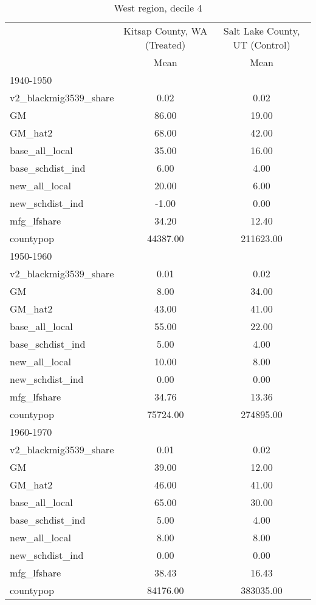 \begin{table}[htbp]\centering
\def\sym#1{\ifmmode^{#1}\else\(^{#1}\)\fi}
\caption{West region, decile 4 \label{tab1}}
\begin{tabular}{l*{2}{c}}
\toprule
                    &\multicolumn{1}{c}{Kitsap County, WA (Treated)}&\multicolumn{1}{c}{Salt Lake County, UT (Control)}\\
                    &        Mean&        Mean\\
\midrule
1940-1950           &            &            \\
v2\_blackmig3539\_share&        0.02&        0.02\\
GM                  &       86.00&       19.00\\
GM\_hat2             &       68.00&       42.00\\
base\_all\_local      &       35.00&       16.00\\
base\_schdist\_ind    &        6.00&        4.00\\
new\_all\_local       &       20.00&        6.00\\
new\_schdist\_ind     &       -1.00&        0.00\\
mfg\_lfshare         &       34.20&       12.40\\
countypop           &    44387.00&   211623.00\\
\midrule
1950-1960           &            &            \\
v2\_blackmig3539\_share&        0.01&        0.02\\
GM                  &        8.00&       34.00\\
GM\_hat2             &       43.00&       41.00\\
base\_all\_local      &       55.00&       22.00\\
base\_schdist\_ind    &        5.00&        4.00\\
new\_all\_local       &       10.00&        8.00\\
new\_schdist\_ind     &        0.00&        0.00\\
mfg\_lfshare         &       34.76&       13.36\\
countypop           &    75724.00&   274895.00\\
\midrule
1960-1970           &            &            \\
v2\_blackmig3539\_share&        0.01&        0.02\\
GM                  &       39.00&       12.00\\
GM\_hat2             &       46.00&       41.00\\
base\_all\_local      &       65.00&       30.00\\
base\_schdist\_ind    &        5.00&        4.00\\
new\_all\_local       &        8.00&        8.00\\
new\_schdist\_ind     &        0.00&        0.00\\
mfg\_lfshare         &       38.43&       16.43\\
countypop           &    84176.00&   383035.00\\
\bottomrule
\end{tabular}
\end{table}
